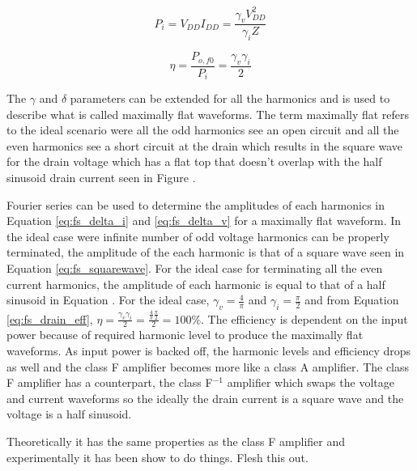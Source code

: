 \begin{equation}\label{eq:fs_dc_pin}
  P_i = V_{DD} I_{DD} = \frac{\gamma_v V_{DD}^2}{\gamma_i Z}
\end{equation}

\begin{equation}\label{eq:fs_drain_eff}
  \eta = \frac{P_{o,f0}}{P_i} = \frac{\gamma_v \gamma_i}{2}
\end{equation}

The $\gamma$ and $\delta$ parameters can be extended for all the harmonics and is used to describe what is called maximally flat waveforms. The term maximally flat refers to the ideal scenario were all the odd harmonics see an open circuit and all the even harmonics see a short circuit at the drain which results in the square wave for the drain voltage which has a flat top that doesn't overlap with the half sinusoid drain current seen in Figure .


Fourier series can be used to determine the amplitudes of each harmonics in Equation \ref{eq:fs_delta_i} and \ref{eq:fs_delta_v} for a maximally flat waveform. In the ideal case were infinite number of odd voltage harmonics can be properly terminated, the amplitude of the each harmonic is that of a square wave seen in Equation \ref{eq:fs_squarewave}. For the ideal case for terminating all the even current harmonics, the amplitude of each harmonic is equal to that of a half sinusoid in Equation . For the ideal case, $\gamma_v = \frac{4}{\pi}$ and $\gamma_i = \frac{\pi}{2}$ and from Equation \ref{eq:fs_drain_eff}, $\eta = \frac{\gamma_v \gamma_i}{2} = \frac{ \frac{4}{\pi} \frac{\pi}{2} }{2} = 100\%$. The efficiency is dependent on the input power because of required harmonic level to produce the maximally flat waveforms. As input power is backed off, the harmonic levels and efficiency drops as well and the class F amplifier becomes more like a class A amplifier. The class F amplifier has a counterpart, the class F$^{-1}$ amplifier which swaps the voltage and current waveforms so the ideally the drain current is a square wave and the voltage is a half sinusoid. 

Theoretically it has the same properties as the class F amplifier and experimentally it has been show to do things. Flesh this out.


